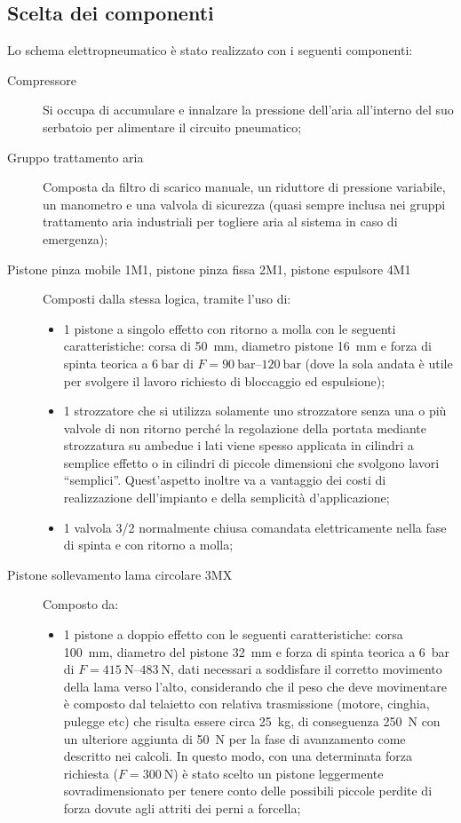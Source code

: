 \documentclass{report}
\begin{document}
\subsection{Scelta dei componenti}
Lo schema elettropneumatico è stato realizzato con i seguenti componenti:
\begin{description}
\item[Compressore] Si occupa di accumulare e innalzare la pressione dell’aria all’interno del suo serbatoio per alimentare il circuito pneumatico;
\item[Gruppo trattamento aria] Composta da filtro di scarico manuale, un riduttore di pressione variabile, un manometro e una valvola di sicurezza (quasi sempre inclusa nei gruppi trattamento aria industriali per togliere aria al sistema in caso di emergenza);
\item[Pistone pinza mobile 1M1, pistone pinza fissa 2M1, pistone espulsore 4M1] Composti dalla stessa logica, tramite l'uso di:
  \begin{itemize}
  \item 1 pistone a singolo effetto con ritorno a molla con le seguenti caratteristiche: corsa di \SI{50}{\mm}, diametro pistone \SI{16}{\mm} e forza di spinta teorica a $\SI{6}{\bar}$ di $F=\SIrange{90}{120}{\bar}$ (dove la sola andata è utile per svolgere il lavoro richiesto di bloccaggio ed espulsione);
  \item 1 strozzatore che si utilizza solamente uno strozzatore senza una o più valvole di non ritorno perché la regolazione della portata mediante strozzatura su ambedue i lati viene spesso applicata in cilindri a semplice effetto o in cilindri di piccole dimensioni che svolgono lavori “semplici”. Quest’aspetto inoltre va a vantaggio dei costi di realizzazione dell’impianto e della semplicità d’applicazione;
  \item 1 valvola 3/2 normalmente chiusa comandata elettricamente nella fase di spinta e con ritorno a molla;
  \end{itemize}
\item[Pistone sollevamento lama circolare 3MX] Composto da:
  \begin{itemize}
  \item 1 pistone a doppio effetto con le seguenti caratteristiche: corsa \SI{100}{\mm}, diametro del pistone \SI{32}{\mm} e forza di spinta teorica a \SI{6}{\bar} di $F=\SIrange{415}{483}{\N}$, dati necessari a soddisfare il corretto movimento della lama verso l'alto, considerando che il peso che deve movimentare è composto dal telaietto con relativa trasmissione (motore, cinghia, pulegge etc) che risulta essere circa \SI{25}{\kg}, di conseguenza \SI{250}{\N} con un ulteriore aggiunta di \SI{50}{\N} per la fase di avanzamento come descritto nei calcoli. In questo modo, con una determinata forza richiesta ($F=\SI{300}{\N}$) è stato scelto un pistone leggermente sovradimensionato per tenere conto delle possibili piccole perdite di forza dovute agli attriti dei perni a forcella;

\end{itemize}
\end{description}
\end{document}
